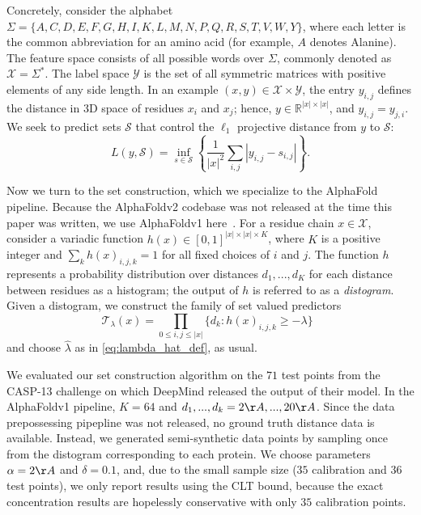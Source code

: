 \documentclass[10pt]{article}
\def\R{\mathbb{R}}
\newcommand{\Y}{\mathcal{Y}}
\newcommand{\X}{\mathcal{X}}
\newcommand{\T}{\mathcal{T}}
\renewcommand{\S}{\mathcal{S}}
\newcommand{\lhat}{\hat{\lambda}}
\begin{document}
Concretely, consider the alphabet $\Sigma=\{A,C,D,E,F,G,H,I,K,L,M,N,P,Q,R,S,T,V,W,Y\}$, where each letter is the common abbreviation for an amino acid (for example, $A$ denotes Alanine).
The feature space consists of all possible words over $\Sigma$, commonly denoted as $\X=\Sigma^*$.
The label space $\Y$ is the set of all symmetric matrices with positive elements of any side length.
In an example $(x,y) \in \X \times \Y$, the entry $y_{i,j}$ defines the distance in 3D space of residues $x_i$ and $x_j$; hence, $y \in \R^{|x|\times |x|}$, and $y_{i,j}=y_{j,i}$.
We seek to predict sets $\S$ that control the $\ell_1$ projective distance from $y$ to $\S$:
\begin{equation}
    \label{eq:protein-loss}
    L(y,\S) = \underset{s \in \S}{\inf} \left\{ \frac{1}{|x|^2}\underset{i,j}{\sum}|y_{i,j}-s_{i,j}|\right\}.
\end{equation}

Now we turn to the set construction, which we specialize to the AlphaFold pipeline.
Because the AlphaFoldv2 codebase was not released at the time this paper was written, we use AlphaFoldv1 here~\cite{senior2020improved}.
For a residue chain $x \in \X$, consider a variadic function $h(x) \in [0,1]^{|x| \times |x| \times K}$, where $K$ is a positive integer and $\underset{k}{\sum}h(x)_{i,j,k}=1$ for all fixed choices of $i$ and $j$.
The function $h$ represents a probability distribution over distances $d_1,...,d_K$ for each distance between residues as a histogram; the output of $h$ is referred to as a {\em distogram}.
Given a distogram, we construct the family of set valued predictors
\begin{equation}
    \label{eq:protein-sets}
    \T_{\lambda}(x) = \prod_{0 \le i,j \le |x|}\big\{ d_k : h(x)_{i,j,k} \geq -\lambda \big\} \; \;
\end{equation}
and choose $\lhat$ as in \eqref{eq:lambda_hat_def}, as usual.

We evaluated our set construction algorithm on the $71$ test points from the CASP-13 challenge on which DeepMind released the output of their model.
In the AlphaFoldv1 pipeline, $K=64$ and $d_1,...,d_k=2\AA,...,20\AA$.
Since the data prepossessing pipepline was not released, no ground truth distance data is available. Instead, we generated semi-synthetic data points by sampling once from the distogram corresponding to each protein.
We choose parameters $\alpha=2\AA$ and $\delta=0.1$, and, due to the small sample size ($35$ calibration and $36$ test points), we only report results using the CLT bound, because the exact concentration results are hopelessly conservative with only $35$ calibration points.
\end{document}
